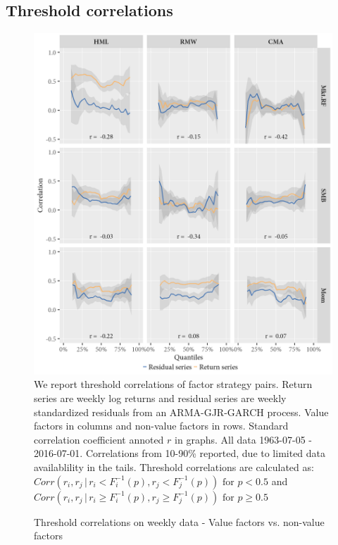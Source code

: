 \subsection{Threshold correlations}
\begin{figure}[H]
  \caption{Threshold correlations on weekly data - Value factors vs. non-value factors}
  \label{diag:thresholdnonvalue}
  \toprule
  \centering
  \begin{minipage}{\textwidth}
  \includegraphics[scale=1]{graphics/threshold_Nonvalue.png}  
  \bottomrule
  \vspace{3mm}
  \footnotesize
  We report threshold correlations of factor strategy pairs. Return series are weekly log returns and residual series are weekly standardized residuals from an ARMA-GJR-GARCH process. Value factors in columns and non-value factors in rows. Standard correlation coefficient annoted $r$ in graphs. All data 1963-07-05 - 2016-07-01. Correlations from 10-90\% reported, due to limited data availablility in the tails. Threshold correlations are calculated as: $Corr(r_i, r_j \,|\, r_i < F_i^{-1}(p), r_j < F_j^{-1}(p)) \text{ for } p < 0.5$ and $Corr(r_i, r_j \,|\, r_i \geq F_i^{-1}(p), r_j \geq F_j^{-1}(p)) \text{ for } p \geq 0.5$ 
  \end{minipage}
\end{figure}
